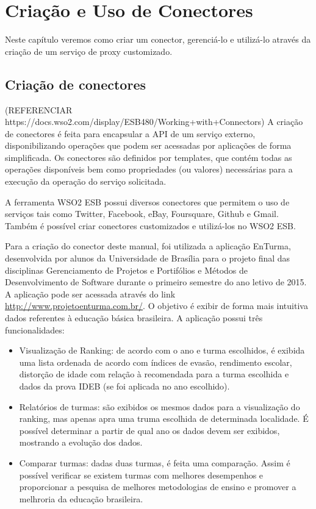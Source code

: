 \chapter[Criação e Uso de Conectores]{Criação e Uso de Conectores}

Neste capítulo veremos como criar um conector, gerenciá-lo e utilizá-lo através da criação de um serviço de proxy customizado.

\section{Criação de conectores}

(REFERENCIAR https://docs.wso2.com/display/ESB480/Working+with+Connectors)
A criação de conectores é feita para encapsular a API de um serviço externo, disponibilizando operações que podem ser acessadas por aplicações de forma simplificada. Os conectores são definidos por templates, que contém todas as operações disponíveis bem como propriedades (ou valores) necessárias para a execução da operação do serviço solicitada.

A ferramenta WSO2 ESB possui diversos conectores que permitem o uso de serviços tais como Twitter, Facebook, eBay, Foursquare, Github e Gmail. Também  é possível criar conectores customizados e utilizá-los no WSO2 ESB.

Para a criação do conector deste manual, foi utilizada a aplicação EnTurma, desenvolvida por alunos da Universidade de Brasília para o projeto final das disciplinas Gerenciamento de Projetos e Portifólios e Métodos de Desenvolvimento de Software durante o primeiro semestre do ano letivo de 2015. A aplicação pode ser acessada através do link \url{http://www.projetoenturma.com.br/}. O objetivo é exibir de forma mais intuitiva dados referentes à educação básica brasileira. A aplicação possui três funcionalidades:
\begin{itemize}
\item Visualização de Ranking: de acordo com o ano e turma escolhidos, é exibida uma lista ordenada de acordo com índices de evasão, rendimento escolar, distorção de idade com relação à recomendada para a turma escolhida e dados da prova IDEB (se foi aplicada no ano escolhido).
\item Relatórios de turmas: são exibidos os mesmos dados para a visualização do ranking, mas apenas apra uma truma escolhida de determinada localidade. É possível determinar a partir de qual ano os dados devem ser exibidos, mostrando a evolução dos dados.
\item Comparar turmas: dadas duas turmas, é feita uma comparação. Assim é possível verificar se existem turmas com melhores desempenhos e proporcionar a pesquisa de melhores metodologias de ensino e promover a melhroria da educação brasileira.
\end{itemize}

